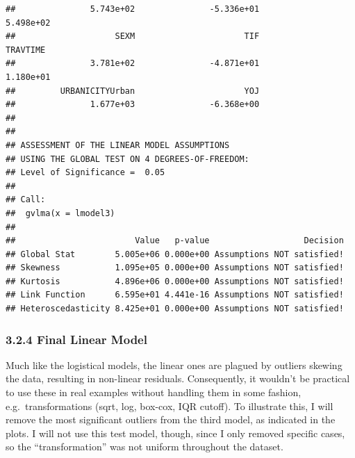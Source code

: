 \documentclass[]{article}
\begin{document}
\begin{verbatim}
##               5.743e+02               -5.336e+01                5.498e+02  
##                    SEXM                      TIF                 TRAVTIME  
##               3.781e+02               -4.871e+01                1.180e+01  
##         URBANICITYUrban                      YOJ  
##               1.677e+03               -6.368e+00  
## 
## 
## ASSESSMENT OF THE LINEAR MODEL ASSUMPTIONS
## USING THE GLOBAL TEST ON 4 DEGREES-OF-FREEDOM:
## Level of Significance =  0.05 
## 
## Call:
##  gvlma(x = lmodel3) 
## 
##                        Value   p-value                   Decision
## Global Stat        5.005e+06 0.000e+00 Assumptions NOT satisfied!
## Skewness           1.095e+05 0.000e+00 Assumptions NOT satisfied!
## Kurtosis           4.896e+06 0.000e+00 Assumptions NOT satisfied!
## Link Function      6.595e+01 4.441e-16 Assumptions NOT satisfied!
## Heteroscedasticity 8.425e+01 0.000e+00 Assumptions NOT satisfied!
\end{verbatim}

\hypertarget{final-linear-model}{\subsubsection{3.2.4 Final Linear
Model}\label{final-linear-model}}

Much like the logistical models, the linear ones are plagued by outliers
skewing the data, resulting in non-linear residuals. Consequently, it
wouldn't be practical to use these in real examples without handling
them in some fashion, e.g.~transformations (sqrt, log, box-cox, IQR
cutoff). To illustrate this, I will remove the most significant outliers
from the third model, as indicated in the plots. I will not use this
test model, though, since I only removed specific cases, so the
``transformation'' was not uniform throughout the dataset.
\end{document}
